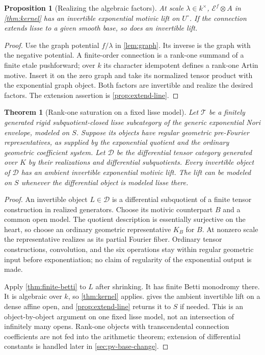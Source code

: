 \documentclass[11pt]{article}
\numberwithin{equation}{section}
\newtheorem{theorem}{Theorem}[section]
\newtheorem{proposition}[proposition]{Proposition}
\theoremstyle{definition}
\theoremstyle{remark}
\newcommand{\Ecal}{\mathcal E}
\newcommand{\Tcal}{\mathcal T}
\newcommand{\Dcal}{\mathcal D}
\begin{document}
\begin{proposition}[Realizing the algebraic factors]\label{prop:realize-line}
At scale $\lambda\in k^\times$, $\Ecal^f\otimes A$ in
\cref{thm:kernel} has an invertible exponential motivic lift on $U^\circ$.
If the connection extends lisse to a given smooth base, so does an
invertible lift.
\end{proposition}
\begin{proof}
Use the graph potential $f/\lambda$ in \cref{lem:graph}. Its inverse
is the graph with the negative potential. A finite-order connection is a
rank-one summand of a finite etale pushforward; over $k$ its character
idempotent defines a rank-one Artin motive. Insert it on the zero graph
and take its normalized tensor product with the exponential graph object.
Both factors are invertible and realize the desired factors. The extension
assertion is \cref{prop:extend-line}.
\end{proof}

\begin{theorem}[Rank-one saturation on a fixed lisse model]\label{thm:saturation}
Let $\Tcal$ be a finitely generated rigid subquotient-closed lisse
subcategory of the generic exponential Nori envelope, modeled on $S$.
Suppose its objects have regular geometric pre-Fourier representatives,
as supplied by the exponential quotient and the ordinary geometric
coefficient system. Let $\Dcal$ be the differential tensor category
generated over $K$ by their realizations and differential subquotients.
Every invertible object of $\Dcal$ has an ambient invertible exponential
motivic lift. The lift can be modeled on $S$ whenever the differential
object is modeled lisse there.
\end{theorem}
\begin{proof}
An invertible object $L\in\Dcal$ is a differential subquotient of a
finite tensor construction in realized generators. Choose its motivic
counterpart $B$ and a common open model. The quotient description is
essentially surjective on the heart, so choose an ordinary geometric
representative $K_B$ for $B$. At nonzero scale the representative realizes
as its partial Fourier fiber. Ordinary tensor constructions, convolution,
and the six operations stay within regular geometric input before
exponentiation; no claim of regularity of the exponential output is made.

Apply \cref{thm:finite-betti} to $L$ after shrinking. It has finite
Betti monodromy there. It is algebraic over $k$, so \cref{thm:kernel}
applies.  gives the ambient invertible lift on a
dense affine open, and \cref{prop:extend-line} returns it to $S$ if needed.
This is an object-by-object argument on one fixed lisse model, not an
intersection of infinitely many opens. Rank-one objects with transcendental
connection coefficients are not fed into the arithmetic theorem; extension
of differential constants is handled later in \cref{sec:pv-base-change}.
\end{proof}
\end{document}
